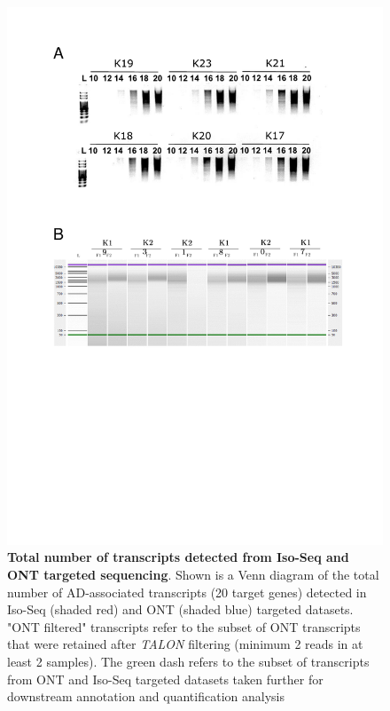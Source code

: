 \begin{figure}[htp]
	\centering
	\vspace{20pt}
	\includegraphics[page=4,trim={0 17cm 0 0cm},clip,scale = 0.75]{Figures/TargetedTranscriptome_ppt.pdf}
	\captionsetup{width=0.95\textwidth}
	\caption[Total number of transcripts detected from Iso-Seq and ONT targeted sequencing]%
	{\textbf{Total number of transcripts detected from Iso-Seq and ONT targeted sequencing}. Shown is a Venn diagram of the total number of AD-associated transcripts (20 target genes) detected in Iso-Seq (shaded red) and ONT (shaded blue) targeted datasets. "ONT filtered" transcripts refer to the subset of ONT transcripts that were retained after \textit{TALON} filtering (minimum 2 reads in at least 2 samples). The green dash refers to the subset of transcripts from ONT and Iso-Seq targeted datasets taken further for downstream annotation and quantification analysis}
	\label{fig:ont_isoseq_venn}
\end{figure}

